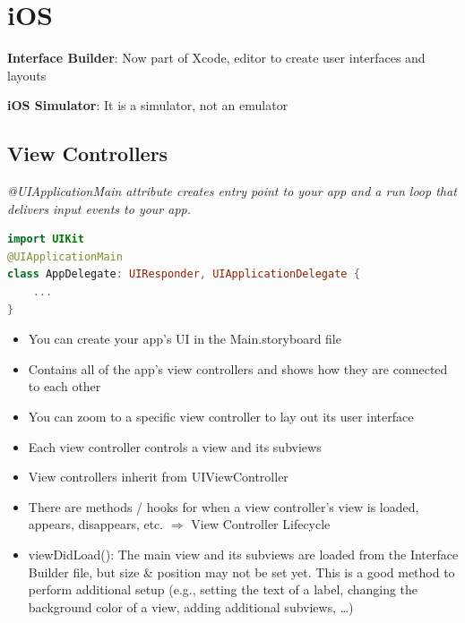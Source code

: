 \section{iOS}

\begin{breakbox}
\textbf{Interface Builder}: Now part
of Xcode, editor to create user interfaces and layouts

\textbf{iOS Simulator}: It is a simulator, not an emulator
\end{breakbox}

\subsection{View Controllers}

\begin{breakbox}

\textit{@UIApplicationMain attribute creates entry point to your app and a
run loop that delivers input events to your app.}

\begin{lstlisting}[language=swift]
import UIKit
@UIApplicationMain
class AppDelegate: UIResponder, UIApplicationDelegate {
    ...
}
\end{lstlisting}
\end{breakbox}

\begin{breakbox}

\begin{itemize}
\tightlist
\item
  You can create your app's UI in the Main.storyboard file
\item
  Contains all of the app's view controllers and shows how they are
  connected to each other
\item
  You can zoom to a specific view controller to lay out its user
  interface
\end{itemize}

\end{breakbox}

\begin{breakbox}

\begin{itemize}
\tightlist
\item
  Each view controller controls a view and its subviews
\item
  View controllers inherit from UIViewController
\item
  There are methods / hooks for when a view controller's view is loaded,
  appears, disappears, etc. $\Rightarrow$ View Controller Lifecycle
\item
  viewDidLoad(): The main view and its subviews are loaded from the
  Interface Builder file, but size \& position may not be set yet. This
  is a good method to perform additional setup (e.g., setting the text
  of a label, changing the background color of a view, adding additional
  subviews, \ldots{})
\end{itemize}
\end{breakbox}

